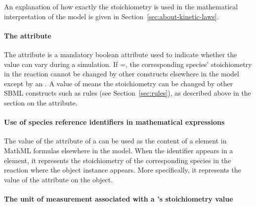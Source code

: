 An explanation of how exactly the stoichiometry is used in the
mathematical interpretation of the model is given in
Section~\ref{sec:about-kinetic-laws}.


\paragraph{The  attribute}

The \SpeciesReference attribute  is a
mandatory boolean attribute used to indicate whether the
 value can vary during a simulation.  If
=, the corresponding species'
stoichiometry in the reaction cannot be changed by other
constructs elsewhere in the model except by an \InitialAssignment.
A value of  means the stoichiometry can be changed by
other SBML constructs such as rules (see Section~\ref{sec:rules}),
as described above in the section on the 
attribute.


\paragraph{Use of species reference identifiers in mathematical expressions}
\label{sec:reaction:speciesReferences-in-mathematical-expressions}

The value of the  attribute of a \SpeciesReference can
be used as the content of a  element in MathML formulas
elsewhere in the model.  When the identifier appears in a 
element, it represents the stoichiometry of the corresponding
species in the reaction where the \SpeciesReference object
instance appears.  More specifically, it represents the value of
the  attribute on the \SpeciesReference
object.


\paragraph{The unit of measurement associated with a
  's stoichiometry value}
\label{sec:speciesreferences-units}

